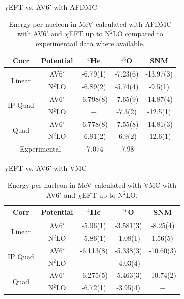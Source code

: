 \documentclass{beamer}
\begin{document}
\begin{frame}{$\chi$EFT vs. AV6$'$ with AFDMC}
\begin{table}[htb]
\centering
\caption[]{Energy per nucleon in MeV calculated with AFDMC with AV6$'$ and $\chi$EFT up to N$^2$LO compared to experimentail data where available.}
\begin{tabular}{ccccc}
\hline\hline
Corr  & Potential  & $^4$He   & $^{16}$O  & SNM \\
\hline
\multirow{2}{*}{Linear} & AV6$'$    & -6.79(1)  & -7.23(6)  & -13.97(3) \\
                        & N$^2$LO   & -6.89(2)  & -5.74(4)  & -9.5(1)   \\
\hline
\multirow{2}{*}{IP Quad}& AV6$'$    & -6.798(8) & -7.65(9)  & -14.87(4) \\
                        & N$^2$LO   & $-$       & -7.3(2)   & -12.5(1)  \\
\hline
\multirow{2}{*}{Quad}   & AV6$'$    & -6.778(8) & -7.55(8)  & -14.81(3) \\
                        & N$^2$LO   & -6.91(2)  & -6.9(2)   & -12.6(1)  \\
\hline\hline
\multicolumn{2}{c}{\multirow{2}{*}{Experimental}}  & \multirow{2}{*}{-7.074} & \multirow{2}{*}{-7.98}   &  \\
                        &           &           &           & \\
\hline\hline
\end{tabular}
\end{table}
\end{frame}

\begin{frame}{$\chi$EFT vs. AV6$'$ with VMC}
\begin{table}[htb]
\centering
\caption[]{Energy per nucleon in MeV calculated with VMC with AV6$'$ and $\chi$EFT up to N$^2$LO.}
\begin{tabular}{ccccc}
\hline\hline
Corr  & Potential  & $^4$He   & $^{16}$O  & SNM \\
\hline
\multirow{2}{*}{Linear} & AV6$'$    & -5.96(1)  & -3.581(3) & -8.25(4)  \\
                        & N$^2$LO   & -5.86(1)  & -1.08(1)  &  1.56(5)  \\
\hline
\multirow{2}{*}{IP Quad}& AV6$'$    & -6.113(8) & -5.338(3) & -10.60(3) \\
                        & N$^2$LO   & $-$       & -4.03(4)  & $-$       \\
\hline
\multirow{2}{*}{Quad}   & AV6$'$    & -6.275(5) & -5.463(3) & -10.74(2) \\
                        & N$^2$LO   & -6.72(1)  & -3.95(4)  & $-$       \\
\hline\hline
\end{tabular}
\end{table}
\end{frame}
\end{document}
